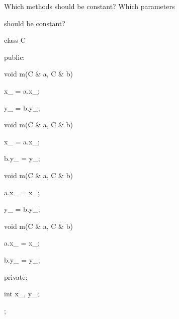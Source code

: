 Which methods should be constant? Which parameters

should be constant?



\begin{consolethree}[escapeinside=||]

class C

{

public:

    void m(C & a, C & b)

    {

        x_ = a.x_;

        y_ = b.y_;

    }

    void m(C & a, C & b)

    {

        x_ = a.x_;

        b.y_ = y_;

    }

    void m(C & a, C & b)

    {

        a.x_ = x_;

        y_ = b.y_;

    }

    void m(C & a, C & b)

    {

        a.x_ = x_;

        b.y_ = y_;

    }

private:

    int x_, y_;

};

\end{consolethree}

